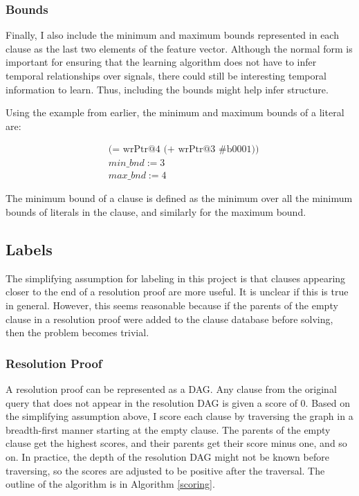 \documentclass[letterpaper]{article} %
\begin{document}
\subsubsection{Bounds}

Finally, I also include the minimum and maximum bounds represented in each clause as the last two elements of the feature vector. Although the normal form is important for ensuring that the learning algorithm does not have to infer temporal relationships over signals, there could still be interesting temporal information to learn. Thus, including the bounds might help infer structure.

Using the example from earlier, the minimum and maximum bounds of a literal are:

\begin{equation*}
\begin{split}
&\text{(= wrPtr@4 (+ wrPtr@3 \#b0001))} \\
&min\_bnd := 3 \\
&max\_bnd := 4
\end{split}
\end{equation*}

The minimum bound of a clause is defined as the minimum over all the minimum bounds of literals in the clause, and similarly for the maximum bound.

\subsection{Labels}
The simplifying assumption for labeling in this project is that clauses appearing closer to the end of a resolution proof are more useful. It is unclear if this is true in general. However, this seems reasonable because if the parents of the empty clause in a resolution proof were added to the clause database before solving, then the problem becomes trivial. 
\subsubsection{Resolution Proof}
A resolution proof can be represented as a DAG. Any clause from the original query that does not appear in the resolution DAG is given a score of $0$. Based on the simplifying assumption above, I score each clause by traversing the graph in a breadth-first manner starting at the empty clause. The parents of the empty clause get the highest scores, and their parents get their score minus one, and so on. In practice, the depth of the resolution DAG might not be known before traversing, so the scores are adjusted to be positive after the traversal. The outline of the algorithm is in Algorithm \ref{scoring}.
\end{document}
